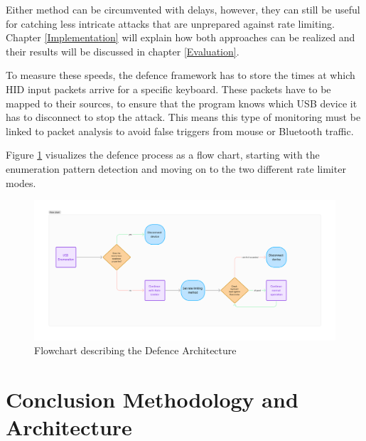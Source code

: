 Either method can be circumvented with delays, however, they can still be useful for catching less intricate attacks that are unprepared against rate limiting.
Chapter \ref{Implementation} will explain how both approaches can be realized and their results will be discussed in chapter \ref{Evaluation}.


To measure these speeds, the defence framework has to store the times at which HID input packets arrive for a specific keyboard. These packets have to be mapped to their sources, to ensure that the program knows which USB device it has to disconnect to stop the attack. This means this type of monitoring must be linked to packet analysis to avoid false triggers from mouse or Bluetooth traffic.

Figure \ref{fig:defence_flowchart} visualizes the defence process as a flow chart, starting with the enumeration pattern detection and moving on to the two different rate limiter modes. 

\begin{figure}[H]
    \centering
    \includegraphics[width=1\linewidth]{visuals/defense_flowchart.png}
    \caption{Flowchart describing the Defence Architecture}
    \label{fig:defence_flowchart}
\end{figure}


\section{Conclusion Methodology and Architecture}

